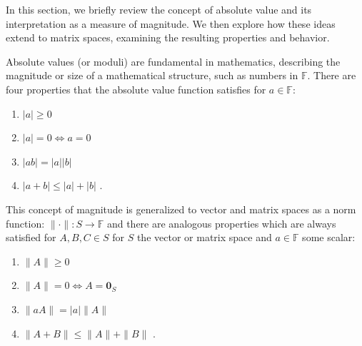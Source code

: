 In this section, we briefly review the concept of absolute value and its interpretation as a measure of magnitude. 
We then explore how these ideas extend to matrix spaces, examining the resulting properties and behavior.
\par Absolute values (or moduli) are fundamental in mathematics, describing the magnitude or size of a mathematical structure, such as numbers in $\mathbb{F}$. 
There are four properties that the absolute value function satisfies for $a\in\mathbb{F}$:
\begin{enumerate}
    \item $|a| \geq 0$ 
    \item $ |a|= 0 \Leftrightarrow a = 0$ 
    \item $|ab| = |a||b|$ 
    \item $|a+b| \leq |a| + |b|$ .
\end{enumerate}
This concept of magnitude is generalized to vector and matrix spaces as a norm function:
$
\|\cdot\| : S \rightarrow \mathbb{F}
$ 
and there are analogous properties which are always satisfied for $A,B,C \in S$ for $S$ the vector or matrix space and $a\in\mathbb{F}$ some scalar:
\begin{enumerate}
    \item $\|A\| \geq 0$ 
    \item $ \|A\|= 0 \Leftrightarrow A = \textbf{0}_S$ 
    \item  $\|aA\| = |a|\|A\|$ 
    \item $\|A+B\| \leq \|A\| + \|B\|$ .
\end{enumerate}
